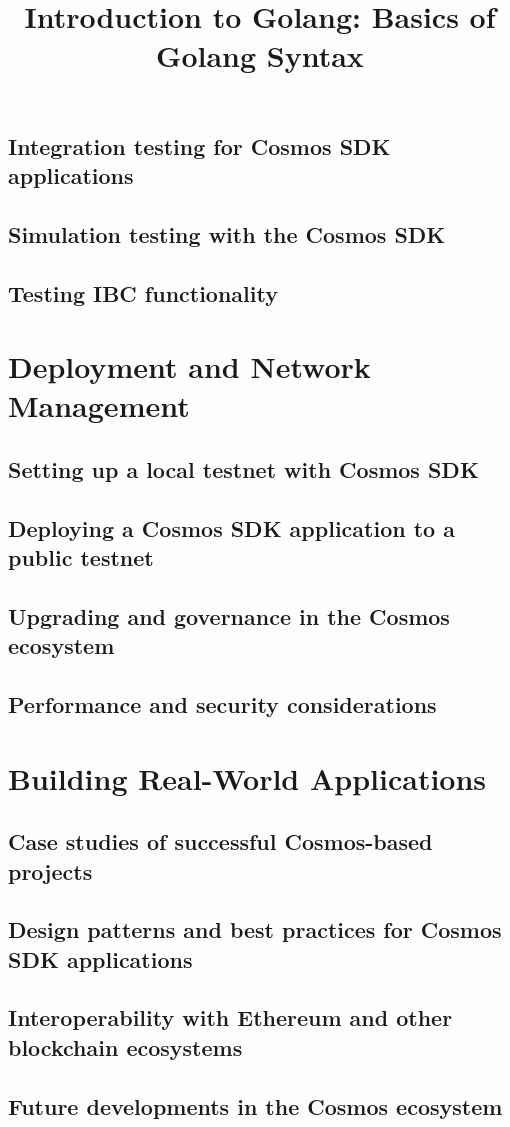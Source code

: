 \documentclass{article}
\begin{document}
\subsection{Integration testing for Cosmos SDK applications}
\subsection{Simulation testing with the Cosmos SDK}
\subsection{Testing IBC functionality}

\section{Deployment and Network Management}

\subsection{Setting up a local testnet with Cosmos SDK}
\subsection{Deploying a Cosmos SDK application to a public testnet}
\subsection{Upgrading and governance in the Cosmos ecosystem}
\subsection{Performance and security considerations}

\section{Building Real-World Applications}

\subsection{Case studies of successful Cosmos-based projects}
\subsection{Design patterns and best practices for Cosmos SDK applications}
\subsection{Interoperability with Ethereum and other blockchain ecosystems}
\subsection{Future developments in the Cosmos ecosystem}


\title{Introduction to Golang: Basics of Golang Syntax}
\end{document}

